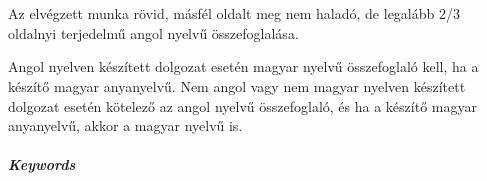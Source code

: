 \chapter*{\summary}

\selectforeignlanguage

Az elvégzett munka rövid, másfél oldalt meg nem haladó, de legalább 2/3 
oldalnyi terjedelmű angol nyelvű összefoglalása.

Angol nyelven készített dolgozat esetén magyar nyelvű összefoglaló kell, ha a
készítő magyar anyanyelvű. Nem angol vagy nem magyar nyelven készített
dolgozat esetén kötelező az angol nyelvű összefoglaló, és ha a készítő magyar
anyanyelvű, akkor a magyar nyelvű is.

\vspace{0.5cm}
\paragraph{Keywords} \emph{\keywords}  %
